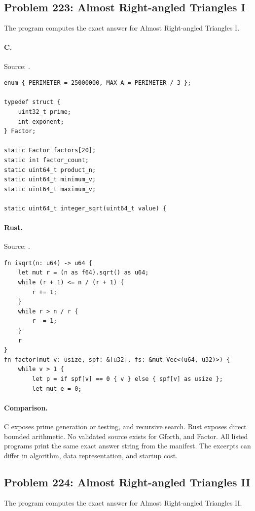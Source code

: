 \subsection{Problem 223: Almost Right-angled Triangles I}
\label{walkthrough:p223}
The program computes the exact answer for Almost Right-angled Triangles I.

\paragraph{C.} Source: .
\begin{lstlisting}
enum { PERIMETER = 25000000, MAX_A = PERIMETER / 3 };

typedef struct {
    uint32_t prime;
    int exponent;
} Factor;

static Factor factors[20];
static int factor_count;
static uint64_t product_n;
static uint64_t minimum_v;
static uint64_t maximum_v;

static uint64_t integer_sqrt(uint64_t value) {
\end{lstlisting}

\paragraph{Rust.} Source: .
\begin{lstlisting}
fn isqrt(n: u64) -> u64 {
    let mut r = (n as f64).sqrt() as u64;
    while (r + 1) <= n / (r + 1) {
        r += 1;
    }
    while r > n / r {
        r -= 1;
    }
    r
}
fn factor(mut v: usize, spf: &[u32], fs: &mut Vec<(u64, u32)>) {
    while v > 1 {
        let p = if spf[v] == 0 { v } else { spf[v] as usize };
        let mut e = 0;
\end{lstlisting}

\paragraph{Comparison.}
C exposes prime generation or testing, and recursive search. Rust exposes direct bounded arithmetic.
No validated source exists for Gforth, and Factor.
All listed programs print the same exact answer string from the manifest. The excerpts can differ in algorithm, data representation, and startup cost.

\subsection{Problem 224: Almost Right-angled Triangles II}
\label{walkthrough:p224}
The program computes the exact answer for Almost Right-angled Triangles II.

